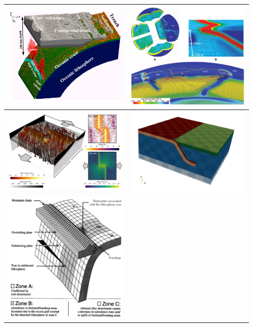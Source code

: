 
\begin{tabular}{p{8cm}p{8cm}}
\hline
\includegraphics[width=6cm]{images/beautiful/zhgt13}\cite{zhgt13} &
\includegraphics[width=6cm]{images/beautiful/stgb10}\cite{stgb10} \\ \hline
\includegraphics[width=6cm]{images/beautiful/dagg19}\cite{dagg19} &
\includegraphics[width=6cm]{images/beautiful/frtv19b}\cite{frtv19} \\ \hline
\includegraphics[width=6cm]{images/beautiful/vabm00} \cite{vabm00}&

\end{tabular}
